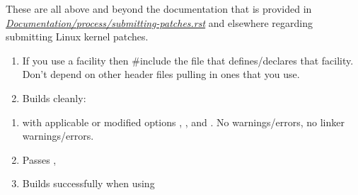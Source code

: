 \documentclass[a4paper,8pt,english]{sphinxmanual}
\begin{document}
These are all above and beyond the documentation that is provided in
{\hyperref[process/submitting\string-patches:submittingpatches]{\emph{Documentation/process/submitting-patches.rst}}}
and elsewhere regarding submitting Linux kernel patches.
\begin{enumerate}
\item {} 
If you use a facility then \#include the file that defines/declares
that facility.  Don't depend on other header files pulling in ones
that you use.

\item {} 
Builds cleanly:

\end{enumerate}
\begin{enumerate}
\item {} 
with applicable or modified  options , , and
.  No  warnings/errors, no linker warnings/errors.

\item {} 
Passes , 

\item {} 
Builds successfully when using 

\end{enumerate}
\end{document}
